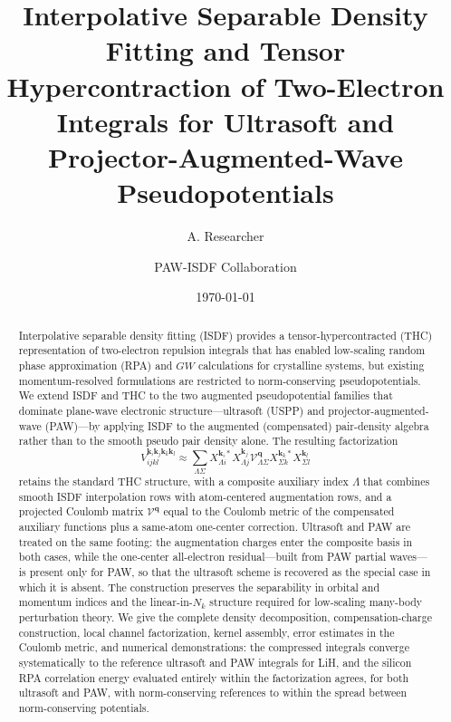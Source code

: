 \documentclass[aps,prb,reprint,superscriptaddress,longbibliography,nofootinbib]{revtex4-2}
\newcommand{\bk}{\mathbf k}
\newcommand{\bq}{\mathbf q}
\begin{document}
\title{Interpolative Separable Density Fitting and Tensor Hypercontraction of Two-Electron Integrals for Ultrasoft and Projector-Augmented-Wave Pseudopotentials}

\author{A. Researcher}
\author{PAW-ISDF Collaboration}
\date{\today}

\begin{abstract}
Interpolative separable density fitting (ISDF) provides a tensor-hypercontracted (THC) representation of two-electron repulsion integrals that has enabled low-scaling random phase approximation (RPA) and \(GW\) calculations for crystalline systems, but existing momentum-resolved formulations are restricted to norm-conserving pseudopotentials.  We extend ISDF and THC to the two augmented pseudopotential families that dominate plane-wave electronic structure---ultrasoft (USPP) and projector-augmented-wave (PAW)---by applying ISDF to the augmented (compensated) pair-density algebra rather than to the smooth pseudo pair density alone.  The resulting factorization
\begin{equation*}
V_{ijkl}^{\bk_i\bk_j\bk_k\bk_l}
\approx
\sum_{\Lambda\Sigma}
X_{\Lambda i}^{\bk_i *}X_{\Lambda j}^{\bk_j}
\mathcal V_{\Lambda\Sigma}^{\bq}
X_{\Sigma k}^{\bk_k *}X_{\Sigma l}^{\bk_l}
\end{equation*}
retains the standard THC structure, with a composite auxiliary index \(\Lambda\) that combines smooth ISDF interpolation rows with atom-centered augmentation rows, and a projected Coulomb matrix \(\mathcal V^{\bq}\) equal to the Coulomb metric of the compensated auxiliary functions plus a same-atom one-center correction.  Ultrasoft and PAW are treated on the same footing: the augmentation charges enter the composite basis in both cases, while the one-center all-electron residual---built from PAW partial waves---is present only for PAW, so that the ultrasoft scheme is recovered as the special case in which it is absent.  The construction preserves the separability in orbital and momentum indices and the linear-in-\(N_k\) structure required for low-scaling many-body perturbation theory.  We give the complete density decomposition, compensation-charge construction, local channel factorization, kernel assembly, error estimates in the Coulomb metric, and numerical demonstrations: the compressed integrals converge systematically to the reference ultrasoft and PAW integrals for LiH, and the silicon RPA correlation energy evaluated entirely within the factorization agrees, for both ultrasoft and PAW, with norm-conserving references to within the spread between norm-conserving potentials.
\end{abstract}
\end{document}
